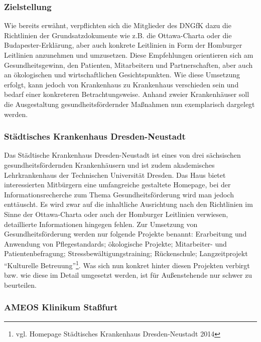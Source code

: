 \subsubsection{Zielstellung}
\label{sec:Zielstellung}

Wie bereits erwähnt, verpflichten sich die Mitglieder des DNGfK dazu die Richtlinien der Grundsatzdokumente wie z.B. die Ottawa-Charta oder die Budapester-Erklärung, aber auch konkrete Leitlinien in Form der Homburger Leitlinien anzunehmen und umzusetzen. Diese Empfehlungen orientieren sich am Gesundheitsgewinn, den  Patienten,  Mitarbeitern und Partnerschaften, aber auch an ökologischen und wirtschaftlichen Gesichtspunkten. Wie diese Umsetzung erfolgt, kann jedoch von Krankenhaus zu Krankenhaus verschieden sein und bedarf einer konkreteren Betrachtungsweise. Anhand zweier Krankenhäuser soll die Ausgestaltung gesundheitsfördernder Maßnahmen nun exemplarisch dargelegt werden. 

\subsubsection{Städtisches Krankenhaus Dresden-Neustadt}
\label{sec:StädtischesKrankenhausDresdenNeustadt}

Das Städtische Krankenhaus Dresden-Neustadt ist eines von drei sächsischen gesundheitsfördernden Krankenhäusern und ist zudem akademisches Lehrkrankenhaus der Technischen Universität Dresden. Das Haus bietet interessierten Mitbürgern eine umfangreiche gestaltete Homepage, bei der Informationsrecherche zum Thema Gesundheitsförderung wird man jedoch enttäuscht. Es wird zwar auf die inhaltliche Ausrichtung nach den Richtlinien im Sinne der Ottawa-Charta oder auch der Homburger Leitlinien verwiesen, detaillierte Informationen hingegen fehlen. Zur Umsetzung von Gesundheitsförderung werden nur folgende Projekte benannt: Erarbeitung und Anwendung von Pflegestandards; ökologische Projekte; Mitarbeiter- und Patientenbefragung; Stressbewältigungstraining; Rückenschule; Langzeitprojekt "`Kulturelle Betreuung"'\footnote{vgl. Homepage Städtisches Krankenhaus Dresden-Neustadt 2014}. Was sich nun konkret hinter diesen Projekten verbirgt bzw. wie diese im Detail umgesetzt werden, ist für Außenstehende nur schwer zu beurteilen. 

\subsubsection{AMEOS Klinikum Staßfurt}
\label{sec:AMEOSKlinikumStassfurt}

